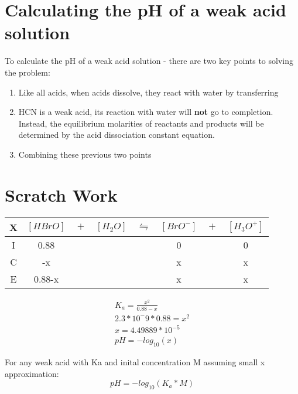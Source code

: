 \documentclass{article}  %
\begin{document}
\section*{Calculating the pH of a weak acid solution}
To calculate the pH of a weak acid solution - there are two key points to solving the problem: 
\begin{enumerate}
    \item Like all acids, when acids dissolve, they react with water by transferring  \\
    \item HCN is a weak acid, its reaction with water will \textbf{not} go to completion. Instead, the equilibrium molarities of reactants and products will be determined by the acid dissociation constant equation.
    \item Combining these previous two points 
\end{enumerate}


\section*{Scratch Work}

\begin{tabular}{c|c@{}c@{}c@{}c@{}c@{}c@{}c}
    \hline
    X   & $[HBrO]$ & ${}+{}$ & $[H_2O]$ & ${}\leftrightharpoons{}$ & $[BrO^-]$ & ${}+{}$ & $[H_3O^+]$ \\
    \hline
    I   &  0.88    &&     &&  0   && 0  \\
    C   &   -x   &&     &&  x   &&  x \\
    E   &   0.88-x   &&     &&   x  && x  \\      
\end{tabular}

\begin{equation*}
    \begin{aligned}
        K_a = \frac{x^2}{0.88-x} \\
        2.3*10^-9 * 0.88 = x^2 \\
        x = 4.49889*10^{-5} \\
        pH = -log_{10}(x)     
    \end{aligned}
\end{equation*}

For any weak acid with Ka and inital concentration M assuming small x approximation:
\begin{equation}
    pH = - log_{10}(K_a*M)
\end{equation}
\end{document}
